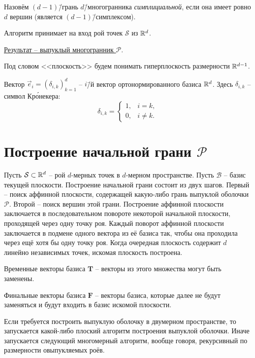 \documentclass[a4paper,12pt]{article}
\newcommand{\R}[1][]{%
  \ifthenelse{\equal{#1}{}}%
  {\mathbb{R}}%
  {\mathbb{R}^{#1}}}
\newcommand{\Swarm}{\mathcal{S}}              %
\newcommand{\Polyhedron}{\mathcal{P}}         %
\newcommand{\Basis}{\mathcal{B}}              %
\newcommand{\TempVec}{\mathbf{T}}  %
\newcommand{\FinalVec}{\mathbf{F}} %
\begin{document}
  Назовём $(d-1)$\=/грань $d$\=/многогранника \textit{симплициальной}, если она имеет ровно $d$ вершин (является $(d-1)$\=/симплексом).

  Алгоритм принимает на вход рой точек $\Swarm$ из $\R[d]$.

  \underline{Результат -- выпуклый многогранник $\Polyhedron$}.

  Под словом <<плоскость>> будем понимать гиперплоскость размерности $\R[d-1]$.

  Вектор $\vec e_i = (\delta_{i,k})_{k=1}^d$ -- $i$\=/й вектор ортонормированного базиса $\R[d]$.
  Здесь $\delta_{i,k}$ -- символ Кр\'{о}некера:
  $$
  \delta_{i,k} =
  \begin{cases}
    1, & i=k, \\
    0, & i\neq k.
  \end{cases}
  $$


\section{Построение начальной грани $\Polyhedron$}
  Пусть $\Swarm \subset \R[d]$ -- рой $d$-мерных точек в $d$-мерном пространстве.
  Пусть $\Basis$ -- базис текущей плоскости. Построение начальной грани состоит из двух шагов. Первый -- поиск аффинной плоскости, содержащей какую-либо грань выпуклой оболочки $\Polyhedron$. Второй -- поиск вершин этой грани. Построение аффинной плоскости заключается в последовательном повороте некоторой начальной плоскости, проходящей через одну точку роя. Каждый поворот аффинной плоскости заключается в подмене одного вектора из её базиса так, чтобы она проходила через ещё хотя бы одну точку роя. Когда очередная плоскость содержит $d$ линейно независимых точек, искомая плоскость построена.

  Временные векторы базиса $\TempVec$ -- векторы из этого множества могут быть заменены.

  Финальные векторы базиса $\FinalVec$ -- векторы базиса, которые далее не будут заменяться и будут входить в базис искомой плоскости.

  Если требуется построить выпуклую оболочку в двумерном пространстве, то запускается какой-либо плоский алгоритм построения выпуклой оболочки. Иначе запускается следующий многомерный алгоритм, вообще говоря, рекурсивный по размерности овыпукляемых роёв.
\end{document}
